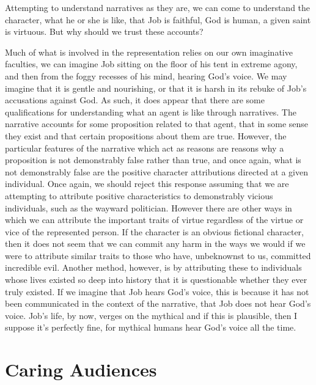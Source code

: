 \documentclass[12pt]{book}
\theoremstyle{definition}
\theoremstyle{remark}
\begin{document}
Attempting to understand narratives as they are, we can come to understand the character, what he or she is like, that Job is faithful, God is human, a given saint is virtuous. But why should we trust these accounts?

Much of what is involved in the representation relies on our own imaginative faculties, we can imagine Job sitting on the floor of his tent in extreme agony, and then from the foggy recesses of his mind, hearing God's voice. We may imagine that it is gentle and nourishing, or that it is harsh in its rebuke of Job's accusations against God. As such, it does appear that there are some qualifications for understanding what an agent is like through narratives. The narrative accounts for some proposition related to that agent, that in some sense they exist and that certain propositions about them are true. However, the particular features of the narrative which act as reasons are reasons why a proposition is not demonstrably false rather than true, and once again, what is not demonstrably false are the positive character attributions directed at a given individual. Once again, we should reject this response assuming that we are attempting to attribute positive characteristics to demonstrably vicious individuals, such as the wayward politician. However there are other ways in which we can attribute the important traits of virtue regardless of the virtue or vice of the represented person. If the character is an obvious fictional character, then it does not seem that we can commit any harm in the ways we would if we were to attribute similar traits to those who have, unbeknownst to us, committed incredible evil. Another method, however, is by attributing these to individuals whose lives existed so deep into history that it is questionable whether they ever truly existed. If we imagine that Job hears God's voice, this is because it has not been communicated in the context of the narrative, that Job does not hear God's voice. Job's life, by now, verges on the mythical and if this is plausible, then I suppose it's perfectly fine, for mythical humans hear God's voice all the time.

\section{Caring Audiences}\label{caring-audiences-1}
\end{document}
